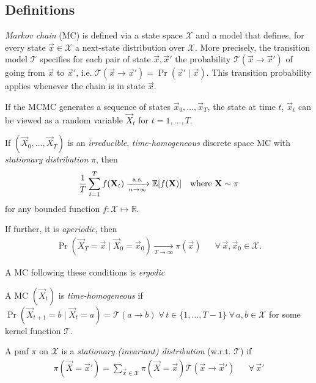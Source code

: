 \subsection{Definitions}
\begin{definition}
    \emph{Markov chain} (MC) is defined via a state space $\mathcal X$ and a model that defines, for every state $\vec x \in \mathcal X$ a next-state distribution over $\mathcal X$. More precisely, the transition model $\mathcal T$ specifies for each pair of state $\vec x, \vec x'$ the probability $\mathcal T(\vec x \to \vec x')$ of going from $\vec x$ to $\vec x'$, i.e. $\mathcal T(\vec x \to \vec x') = \Pr(\vec x' \mid \vec x)$. This transition probability applies whenever the chain is in state $\vec x$.
\end{definition}

If the MCMC generates a sequence of states $\vec x_0, \dotsc, \vec x_T$, the state at time $t$, $\vec x_t$ can be viewed as a random variable $\vec X_t$ for $t = 1, \dotsc, T$.

\begin{theorem}
    If $(\vec X_0, \dotsc, \vec X_T)$ is an \emph{irreducible}, \emph{time-homogeneous} discrete space MC with \emph{stationary distribution} $\pi$, then
    \begin{align}
        \frac{1}{T} \sum_{t = 1}^T f(\boldsymbol{\mathbf{X}}_t) \xrightarrow[n \to \infty]{\text{a.s.}} \operatorname{\mathbb{E}}[f(\boldsymbol{\mathbf{X}})] && \text{where } \boldsymbol{\mathbf{X}} \sim \pi
    \end{align}
    for any bounded function $f: \mathcal X \mapsto \mathbb R$.

    If further, it is \emph{aperiodic}, then
    \begin{align}
        \Pr(\vec X_T = \vec x \mid \vec X_0 = \vec x_0) \xrightarrow[T \to \infty]{} \pi(\vec x) && \forall\,\vec x, \vec x_0 \in \mathcal X.
    \end{align}

    A MC following these conditions is \emph{ergodic}
\end{theorem}

\begin{definition}
    A MC $(\vec X_t)$ is \emph{time-homogeneous} if $\Pr(\vec X_{t + 1} = b \mid \vec X_t = a) = \mathcal T(a \to b) \;\forall\, t \in \{1, \dotsc, T - 1\} \;\forall\, a, b \in \mathcal X$ for some kernel function $\mathcal T$.
\end{definition}

\begin{definition}
    A pmf $\pi$ on $\mathcal X$ is a \emph{stationary (invariant) distribution} (w.r.t. $\mathcal T$) if
    \begin{align}
        \pi(\vec X = \vec x') = \sum_{\vec x \in \mathcal X} \pi(\vec X = \vec x)\mathcal T(\vec x \to \vec x') && \forall\,\vec x' \label{eqn:stationary}
    \end{align}
\end{definition}

